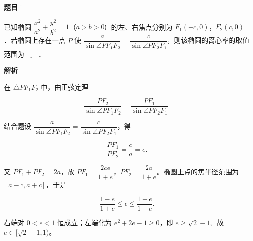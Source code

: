 \begin{answer}

\textbf{题目}：

已知椭圆 $\dfrac{x^2}{a^2}+\dfrac{y^2}{b^2}=1$（$a>b>0$）的左、右焦点分别为 $F_1(-c,0)$，$F_2(c,0)$．若椭圆上存在一点 $P$ 使 $\dfrac a{\sin\angle PF_1F_2}=\dfrac c{\sin\angle PF_2F_1}$，则该椭圆的离心率的取值范围为$\underline{\qquad}$．

\textbf{解析}

在 $\triangle PF_1F_2$ 中，由正弦定理

\nopagebreak[4]
\[\frac{PF_2}{\sin\angle PF_1F_2}=\frac{PF_1}{\sin\angle PF_2F_1}.\]

结合题设 $\dfrac a{\sin\angle PF_1F_2}=\dfrac c{\sin\angle PF_2F_1}$，得

\nopagebreak[4]
\[\frac{PF_1}{PF_2}=\frac ca=e.\]

又 $PF_1+PF_2=2a$，故 $PF_1=\dfrac{2ae}{1+e}$，$PF_2=\dfrac{2a}{1+e}$。椭圆上点的焦半径范围为 $[a-c,a+c]$，于是

\nopagebreak[4]
\[\frac{1-e}{1+e}\leqslant e\leqslant\frac{1+e}{1-e}.\]

右端对 $0<e<1$ 恒成立；左端化为 $e^2+2e-1\geqslant0$，即 $e\geqslant\sqrt2-1$。故 $e\in[\sqrt2-1,1)$。

\gkanswer{答案：$[\sqrt2-1,1)$。}

\end{answer}
